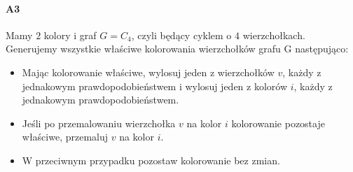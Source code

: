 \paragraph{A3} Mamy $2$ kolory i graf $G = C_4$, czyli będący cyklem o $4$ wierzchołkach. Generujemy wszystkie właściwe kolorowania wierzchołków grafu G następująco:
\begin{itemize}
\item Mając kolorowanie właściwe, wylosuj jeden z wierzchołków $v$, każdy z jednakowym prawdopodobieństwem i wylosuj jeden z kolorów $i$, każdy z jednakowym prawdopodobieństwem.
\item Jeśli po przemalowaniu wierzchołka $v$ na kolor $i$ kolorowanie pozostaje właściwe, przemaluj $v$ na kolor $i$.
\item W przeciwnym przypadku pozostaw kolorowanie bez zmian.
\end{itemize}
